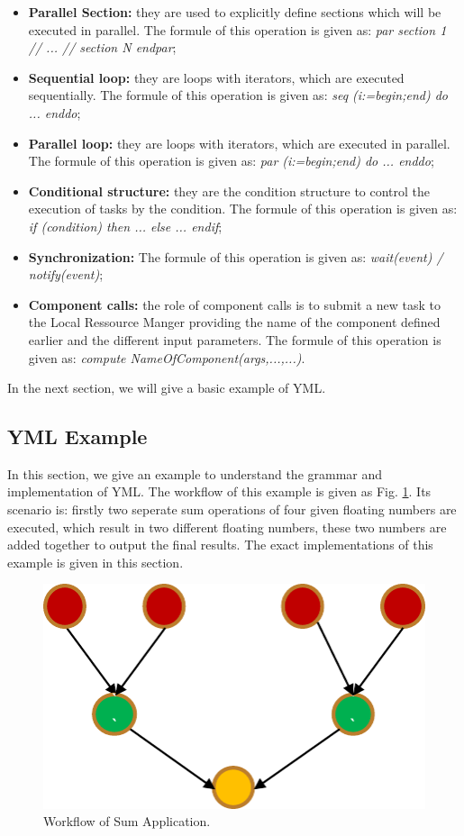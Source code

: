 \begin{itemize}
	\item \textbf{Parallel Section:} they are used to explicitly define sections which will be executed in parallel. The formule of this operation is given as: \textit{par section 1 // ... // section N endpar};
	\item \textbf{Sequential loop:} they are loops with iterators, which are executed sequentially. The formule of this operation is given as: \textit{seq (i:=begin;end) do ... enddo};
	\item \textbf{Parallel loop:} they are loops with iterators, which are executed in parallel. The formule of this operation is given as: \textit{par (i:=begin;end) do ... enddo};
	\item \textbf{Conditional structure:} they are the condition structure to control the execution of tasks by the condition. The formule of this operation is given as: \textit{if (condition) then ... else ... endif};
	\item \textbf{Synchronization:} The formule of this operation is given as: \textit{wait(event) / notify(event)};
	\item \textbf{Component calls:} the role of component calls is to submit a new task to the Local Ressource Manger providing the name of the component defined earlier and the different input parameters. The formule of this operation is given as: \textit{compute NameOfComponent(args,...,...)}.
\end{itemize}

In the next section, we will give a basic example of YML.

\subsection{YML Example}

In this section, we give an example to understand the grammar and implementation of YML. The workflow of this example is given as Fig. \ref{fig:sum_workflow}. Its scenario is: firstly two seperate sum operations of four given floating numbers are executed, which result in two different floating numbers, these two numbers are added together to output the final results. The exact implementations of this example is given in this section.
 
\begin{figure}[htbp]
	\centering
	\includegraphics[width=3.in]{fig/sum_workflow.pdf}
	\caption{Workflow of Sum Application.}
	\label{fig:sum_workflow}
\end{figure}

